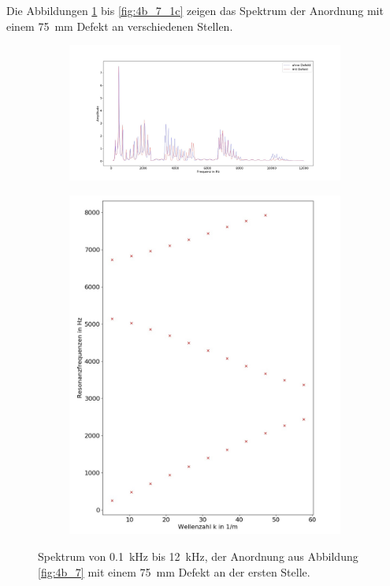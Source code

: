 Die Abbildungen \ref{fig:4b_7_1a} bis \ref{fig:4b_7_1c} zeigen das Spektrum der Anordnung mit einem 75~mm Defekt an verschiedenen Stellen.
\begin{figure}
\centering
\begin{subfigure}{0.65\textwidth}
\includegraphics[width=\textwidth]{content/Scripts/defect1.jpg}
\end{subfigure}
\begin{subfigure}{0.34\textwidth}
\includegraphics[width=\textwidth]{content/Scripts/4b_7_1a.jpg}
\end{subfigure}
\caption{Spektrum von 0.1~kHz bis 12~kHz, der Anordnung aus Abbildung \ref{fig:4b_7} mit einem 75~mm Defekt an der ersten Stelle.}
\label{fig:4b_7_1a}
\end{figure}
